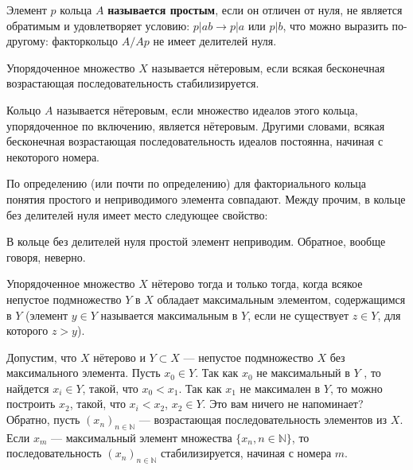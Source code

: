 \documentclass{../../template/mai_book}
\begin{document}
\begin{determ}
\textit{\indent} Элемент $p$ кольца $A$ \textbf{называется простым}, если он отличен от нуля, не является обратимым и удовлетворяет условию: $p | ab \rightarrow p | a$ или $p | b$, что можно выразить по-другому: факторкольцо $A/Ap$ не имеет делителей нуля.
\end{determ}

\begin{determ}
\textit{\indent} Упорядоченное множество $X$ называется нётеровым, если всякая бесконечная возрастающая последовательность стабилизируется.
\end{determ}

\newpage
\begin{determ}
\textit{\indent} Кольцо $A$ называется нётеровым, если множество идеалов этого кольца, упорядоченное по включению, является нётеровым. Другими словами, всякая бесконечная возрастающая последовательность идеалов постоянна, начиная с некоторого номера.
\end{determ}

По определению (или почти по определению) для факториального кольца понятия простого и неприводимого элемента совпадают. Между прочим, в кольце без делителей нуля имеет место следующее свойство:

\begin{determ}
\textit{\indent} В кольце без делителей нуля простой элемент неприводим. Обратное, вообще говоря, неверно.
\end{determ}

\begin{determ}
\textit{\indent} Упорядоченное множество $X$ нётерово тогда и только тогда, когда всякое непустое подмножество $Y$ в $X$ обладает максимальным элементом, содержащимся в $Y$ (элемент $y \in Y$ называется максимальным в $Y$, если не существует $z \in Y$, для которого $z > y$).
\end{determ}

\begin{myproof}
Допустим, что $X$ нётерово и $Y \subset X$ — непустое подмножество $X$ без максимального элемента. Пусть $x_0 \in Y$. Так как $x_0$ не максимальный в $Y$ , то найдется $x_i \in Y$, такой, что $x_0 < x_1$. Так как $x_1$ не максимален в $Y$, то можно построить $x_2$, такой, что $x_i < x_2$, $x_2 \in Y$. Это вам ничего не напоминает? \newline Обратно, пусть $(x_n)_{n \in \mathds{N}}$ — возрастающая последовательность элементов из $X$. Если $x_m$ — максимальный элемент множества $\{x_n,n \in \mathds{N}\}$, то последовательность $(x_n)_{n \in \mathds{N}}$ стабилизируется, начиная с номера $m$.\\
\end{myproof}
\end{document}
